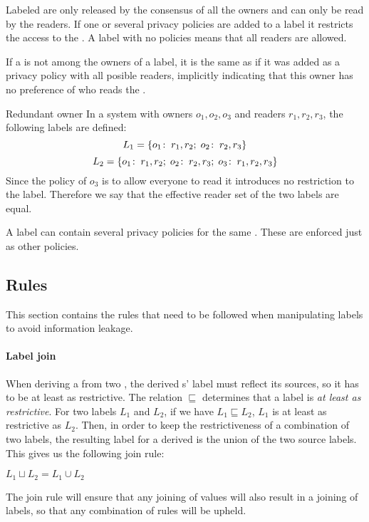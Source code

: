 Labeled \xvalues{} are only released by the consensus of all the owners and can only be read by the readers.
If one or several privacy policies are added to a label it restricts the access to the \xvalue{}.
A label with no policies  means that all readers are allowed.

If a \principal{} is not among the owners of a label, it is the same as if it was added as a privacy policy with all posible readers, implicitly indicating that this owner has no preference of who reads the \xvalue{}.

\begin{example}{Redundant owner}
In a system with owners $o_1, o_2, o_3$ and readers $r_1, r_2, r_3$, the following labels are defined:
$$L_1 = \{o_1\!:\;r_1,r_2;\; o_2\!:\;r_2, r_3\}$$
$$L_2 = \{o_1\!:\;r_1,r_2;\; o_2\!:\;r_2, r_3;\; o_3\!:\;r_1, r_2, r_3\}$$
Since the policy of $o_3$ is to allow everyone to read it introduces no restriction to the label.
Therefore we say that the effective reader set of the two labels are equal.
\end{example}

A label can contain several privacy policies for the same \principal{}.
These are enforced just as other policies.

\subsection{Rules}
This section contains the rules that need to be followed when manipulating labels to avoid information leakage.

\paragraph{Label join}
When deriving a \xvalue{} from two \xvalues{}, the derived \xvalue{}s' label must reflect its sources, so it has to be at least as restrictive.
The relation $\sqsubseteq$ determines that a label is \textit{at least as restrictive}.
For two labels $L_1$ and $L_2$, if we have $L_1 \sqsubseteq L_2$, $L_1$ is at least as restrictive as $L_2$.
Then, in order to keep the restrictiveness of a combination of two labels, the resulting label for a derived \xvalue{} is the union of the two source labels.
This gives us the following join rule:
\begin{definition}
  $L_1 \sqcup L_2 = L_1 \cup L_2$
\end{definition}

The join rule will ensure that any joining of values will also result in a joining of labels, so that any combination of rules will be upheld.


